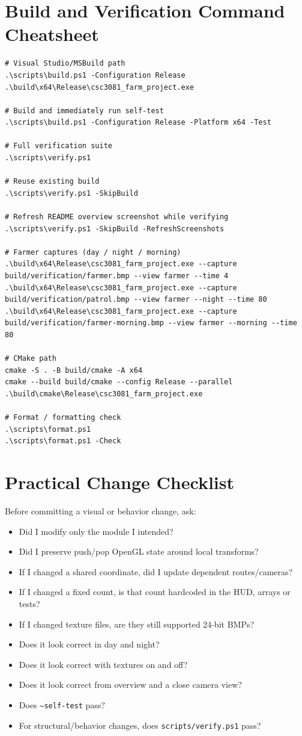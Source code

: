 \documentclass[11pt,a4paper,openany]{book}
\newcommand{\code}[1]{\texttt{#1}}
\newcommand{\file}[1]{\nolinkurl{#1}}
\begin{document}
\chapter{Build and Verification Command Cheatsheet}
\begin{lstlisting}
# Visual Studio/MSBuild path
.\scripts\build.ps1 -Configuration Release
.\build\x64\Release\csc3081_farm_project.exe

# Build and immediately run self-test
.\scripts\build.ps1 -Configuration Release -Platform x64 -Test

# Full verification suite
.\scripts\verify.ps1

# Reuse existing build
.\scripts\verify.ps1 -SkipBuild

# Refresh README overview screenshot while verifying
.\scripts\verify.ps1 -SkipBuild -RefreshScreenshots

# Farmer captures (day / night / morning)
.\build\x64\Release\csc3081_farm_project.exe --capture build/verification/farmer.bmp --view farmer --time 4
.\build\x64\Release\csc3081_farm_project.exe --capture build/verification/patrol.bmp --view farmer --night --time 80
.\build\x64\Release\csc3081_farm_project.exe --capture build/verification/farmer-morning.bmp --view farmer --morning --time 80

# CMake path
cmake -S . -B build/cmake -A x64
cmake --build build/cmake --config Release --parallel
.\build\cmake\Release\csc3081_farm_project.exe

# Format / formatting check
.\scripts\format.ps1
.\scripts\format.ps1 -Check
\end{lstlisting}

\chapter{Practical Change Checklist}
Before committing a visual or behavior change, ask:
\begin{itemize}
	\item Did I modify only the module I intended?
	\item Did I preserve push/pop OpenGL state around local transforms?
	\item If I changed a shared coordinate, did I update dependent routes/cameras?
	\item If I changed a fixed count, is that count hardcoded in the HUD, arrays or tests?
	\item If I changed texture files, are they still supported 24-bit BMPs?
	\item Does it look correct in day and night?
	\item Does it look correct with textures on and off?
	\item Does it look correct from overview and a close camera view?
	\item Does \code{--self-test} pass?
	\item For structural/behavior changes, does \file{scripts/verify.ps1} pass?
\end{itemize}
\end{document}
